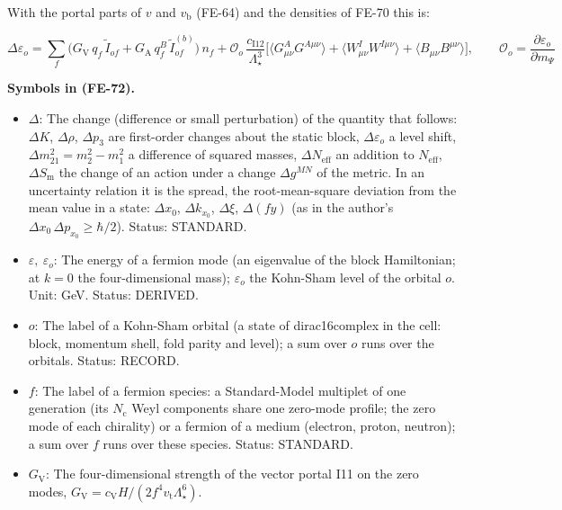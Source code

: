 \documentclass[
  10pt,
]{article}
\providecommand{\tightlist}{%
  \setlength{\itemsep}{0pt}\setlength{\parskip}{0pt}}
\begin{document}
With the portal parts of \(v\) and \(v_{\mathrm{b}}\) (FE-64) and the
densities of FE-70 this is:

\[
\Delta\varepsilon_o = \sum_f\big(G_{\mathrm{V}}\,q_f\,\tilde I_{of} + G_{\mathrm{A}}\,q^{B}_f\,\tilde
 I^{(b)}_{of}\big)\,n_f
 + \mathcal{O}_o\,\frac{c_{\mathrm{I12}}}{\Lambda_\star^3}\Big[\big\langle G^A_{\mu\nu}G^{A\mu\nu}\big\rangle
 + \big\langle W^I_{\mu\nu}W^{I\mu\nu}\big\rangle + \big\langle B_{\mu\nu}B^{\mu\nu}\big\rangle\Big],
 \qquad \mathcal{O}_o = \frac{\partial\varepsilon_o}{\partial m_\Psi} \tag{FE-72}
\]

\textbf{Symbols in (FE-72).}

\begin{itemize}
\tightlist
\item
  \(\Delta\): The change (difference or small perturbation) of the
  quantity that follows: \(\Delta K\), \(\Delta\rho\), \(\Delta p_3\)
  are first-order changes about the static block,
  \(\Delta\varepsilon_o\) a level shift,
  \(\Delta m^2_{21} = m_2^2 - m_1^2\) a difference of squared masses,
  \(\Delta N_{\mathrm{eff}}\) an addition to \(N_{\mathrm{eff}}\),
  \(\Delta S_{\mathrm{m}}\) the change of an action under a change
  \(\Delta g^{MN}\) of the metric. In an uncertainty relation it is the
  spread, the root-mean-square deviation from the mean value in a state:
  \(\Delta x_0\), \(\Delta k_{x_0}\), \(\Delta\xi\), \(\Delta(fy)\) (as
  in the author's \(\Delta x_0\,\Delta p_{x_0} \ge \hbar/2\)). Status:
  STANDARD.
\item
  \(\varepsilon,\ \varepsilon_o\): The energy of a fermion mode (an
  eigenvalue of the block Hamiltonian; at \(k = 0\) the four-dimensional
  mass); \(\varepsilon_o\) the Kohn-Sham level of the orbital \(o\).
  Unit: GeV. Status: DERIVED.
\item
  \(o\): The label of a Kohn-Sham orbital (a state of dirac16complex in
  the cell: block, momentum shell, fold parity and level); a sum over
  \(o\) runs over the orbitals. Status: RECORD.
\item
  \(f\): The label of a fermion species: a Standard-Model multiplet of
  one generation (its \(N_{\mathrm{c}}\) Weyl components share one
  zero-mode profile; the zero mode of each chirality) or a fermion of a
  medium (electron, proton, neutron); a sum over \(f\) runs over these
  species. Status: STANDARD.
\item
  \(G_{\mathrm{V}}\): The four-dimensional strength of the vector portal
  I11 on the zero modes,
  \(G_{\mathrm{V}} = c_{\mathrm{V}}H/(2f^4v_{\mathrm{t}}\Lambda_\star^6)\).

\end{itemize}
\end{document}

